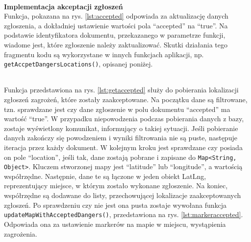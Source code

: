 \noindent
\setlength{\fboxrule}{0.5pt}
\begin{minipage}{\linewidth}
    \label{lst:danger}
    \centering
\end{minipage}
\\

\noindent
\textbf{Implementacja akceptacji zgłoszeń} \\ 
\indent Funkcja, pokazana na rys. \ref{lst:accepted} odpowiada za aktualizację danych zgłoszenia, a dokładniej ustawienie wartości pola “accepted” na “true”. Na podstawie identyfikatora dokumentu, przekazanego w parametrze funkcji, wiadome jest, które zgłoszenie należy zaktualizować. Skutki działania tego fragmentu kodu są wykorzystane w innych funkcjach aplikacji, np. \verb|getAccpetDangersLocations()|, opisanej poniżej.

\noindent
\setlength{\fboxrule}{0.5pt}
\begin{minipage}{\linewidth}
    \label{lst:accepted}
    \centering
\end{minipage}
\\

Funkcja przedstawiona na rys. \ref{lst:getaccepted} służy do pobierania lokalizacji zgłoszeń zagrożeń, które zostały zaakceptowane. Na początku dane są filtrowane, tzn. sprawdzane jest czy dane zgłoszenie w polu dokumentu “accepted” ma wartość “true”. W przypadku niepowodzenia podczas pobierania danych z bazy, zostaje wyświetlony komunikat, informujący o takiej sytuacji. Jeśli pobieranie danych zakończy się powodzeniem i wyniki filtrowania nie są puste, następuje iteracja przez każdy dokument. W kolejnym kroku jest sprawdzane czy posiada on pole “location”, jeśli tak, dane zostają pobrane i zapisane do \verb|Map<String, Object>|. Kluczem stworzonej mapy jest “latitude” lub “longitude”, a wartością współrzędne. Następnie, dane te są łączone w jeden obiekt LatLng, reprezentujący miejsce, w którym zostało wykonane zgłoszenie. Na koniec, współrzędne są dodawane do listy, przechowującej lokalizacje zaakceptowanych zgłoszeń. Po sprawdzeniu czy nie jest ona pusta zostaje wywołana funkcja \verb|updateMapWithAcceptedDangers()|, przedstawiona na rys. \ref{lst:markeraccepted}. Odpowiada ona za ustawienie markerów na mapie w miejscu, wystąpienia zagrożenia. \\

